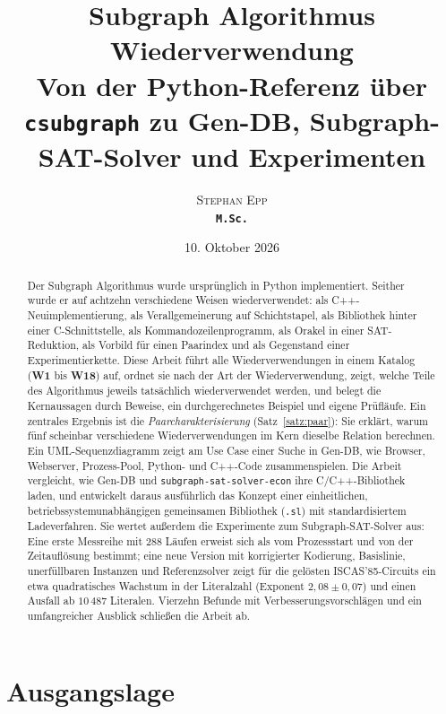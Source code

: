 \documentclass[a4paper,12pt,twoside]{report}
\title{\textbf{Subgraph Algorithmus\\Wiederverwendung}\\[0.4em]
	\large Von der Python-Referenz über \texttt{csubgraph} zu Gen-DB, Subgraph-SAT-Solver und Experimenten}
\author{\textsc{Stephan Epp}\\ {\small \texttt{\textbf{M.Sc.}}}}
\date{10. Oktober 2026}
\DeclareRobustCommand{\_}{\textunderscore\allowbreak{}}
\theoremstyle{definition}
\newcommand{\W}[1]{\textbf{W#1}}
\begin{document}
 
\maketitle
 
\begin{abstract}\noindent
	Der Subgraph Algorithmus wurde ursprünglich in Python implementiert. Seither wurde er auf achtzehn verschiedene Weisen wiederverwendet: als C++-Neuimplementierung, als Verallgemeinerung auf Schichtstapel, als Bibliothek hinter einer C-Schnittstelle, als Kommandozeilenprogramm, als Orakel in einer SAT-Reduktion, als Vorbild für einen Paarindex und als Gegenstand einer Experimentierkette. Diese Arbeit führt alle Wiederverwendungen in einem Katalog (\W{1} bis \W{18}) auf, ordnet sie nach der Art der Wiederverwendung, zeigt, welche Teile des Algorithmus jeweils tatsächlich wiederverwendet werden, und belegt die Kernaussagen durch Beweise, ein durchgerechnetes Beispiel und eigene Prüfläufe. Ein zentrales Ergebnis ist die \emph{Paarcharakterisierung} (Satz~\ref{satz:paar}): Sie erklärt, warum fünf scheinbar verschiedene Wiederverwendungen im Kern dieselbe Relation berechnen. Ein UML-Sequenzdiagramm zeigt am Use Case einer Suche in Gen-DB, wie Browser, Webserver, Prozess-Pool, Python- und C++-Code zusammenspielen. Die Arbeit vergleicht, wie Gen-DB und \texttt{subgraph-sat-solver-econ} ihre C/C++-Bibliothek laden, und entwickelt daraus ausführlich das Konzept einer einheitlichen, betriebssystemunabhängigen gemeinsamen Bibliothek (\texttt{.sl}) mit standardisiertem Ladeverfahren. Sie wertet außerdem die Experimente zum Subgraph-SAT-Solver aus: Eine erste Messreihe mit $288$ Läufen erweist sich als vom Prozessstart und von der Zeitauflösung bestimmt; eine neue Version mit korrigierter Kodierung, Basislinie, unerfüllbaren Instanzen und Referenzsolver zeigt für die gelösten ISCAS'85-Circuits ein etwa quadratisches Wachstum in der Literalzahl (Exponent $2{,}08\pm0{,}07$) und einen Ausfall ab $10\,487$ Literalen. Vierzehn Befunde mit Verbesserungsvorschlägen und ein umfangreicher Ausblick schließen die Arbeit ab.
\end{abstract}
 
\setcounter{tocdepth}{2}
\tableofcontents
\newpage
{}
 
\part{Ausgangslage}
 
\end{document}
